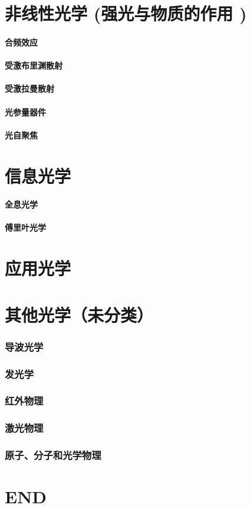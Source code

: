 \documentclass[UTF8]{../06-Physics}
\begin{document}
\chapter{非线性光学 (强光与物质的作用 )}
    \subsubsection{合频效应}
    \subsubsection{受激布里渊散射}
    \subsubsection{受激拉曼散射}
    \subsubsection{光参量器件}
    \subsubsection{光自聚焦}


\chapter{信息光学}
    \subsubsection{全息光学}
    \subsubsection{傅里叶光学}




\chapter{应用光学}



\chapter{其他光学（未分类）}
    \subsection{导波光学}
    \subsection{发光学}
    \subsection{红外物理}
    \subsection{激光物理}
    \subsection{原子、分子和光学物理}


\chapter{END}
    
\end{document}
